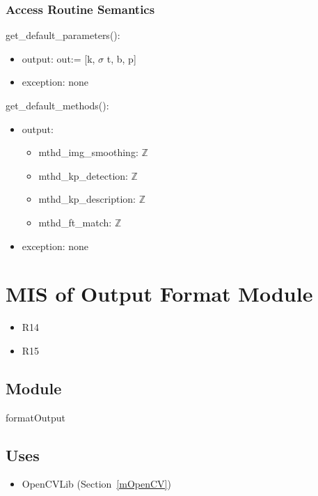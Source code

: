 \documentclass[12pt, titlepage]{article}
\begin{document}
\subsubsection{Access Routine Semantics}
\noindent get\_default\_parameters():
\begin{itemize}
\item output: out:= [k, $\sigma$ t, b, p]
  \item exception: none  
\end{itemize}

\noindent get\_default\_methods():
\begin{itemize}
\item output:
  \begin{itemize}
    \item mthd\_img\_smoothing: $\mathbb{Z}$
    \item mthd\_kp\_detection: $\mathbb{Z}$ 
    \item mthd\_kp\_description: $\mathbb{Z}$
    \item mthd\_ft\_match: $\mathbb{Z}$
  \end{itemize}
  \item exception: none 
\end{itemize}



\section{MIS of Output Format Module} \label{mOF}
\begin{itemize}
  \item R14
  \item R15
\end{itemize}
\subsection{Module}

formatOutput

\subsection{Uses}
\begin{itemize}
  \item OpenCVLib (Section~\ref{mOpenCV})
\end{itemize}
\end{document}
